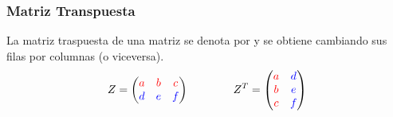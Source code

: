 \documentclass[stu, 12pt, letterpaper, donotrepeattitle, floatsintext, natbib]{apa7}
\begin{document}
    \subsubsection{Matriz Transpuesta}
    La matriz traspuesta de una matriz se denota por y se obtiene cambiando sus filas por columnas (o viceversa).
    \[
        Z =
        \begin{pmatrix}
            \color{red} a  & \color{red} b & \color{red}c  \\
            \color{blue} d & \color{blue}e & \color{blue}f
        \end{pmatrix}
        \qquad \qquad
        Z^T =
        \begin{pmatrix}
            \color{red}a & \color{blue}d \\
            \color{red}b & \color{blue}e \\
            \color{red}c & \color{blue}f \\
        \end{pmatrix}
    \]
\end{document}
